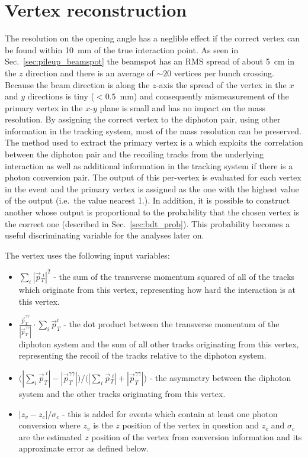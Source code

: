 \section{Vertex reconstruction}
\label{sec:vtx_reco}

The resolution on the opening angle has a neglible effect if the correct vertex can be found within 10~mm of the true interaction point. As seen in Sec.~\ref{sec:pileup_beamspot} the beamspot has an RMS spread of about 5~cm in the $z$ direction and there is an average of $\sim20$ vertices per bunch crossing. Because the beam direction is along the $z$-axis the spread of the vertex in the $x$ and $y$ directions is tiny ($<0.5$~mm) and consequently mismeasurement of the primary vertex in the $x$-$y$ plane is small and has no impact on the mass resolution. By assigning the correct vertex to the diphoton pair, using other information in the tracking system, most of the mass resolution can be preserved. The method used to extract the primary vertex is a \BDT which exploits the correlation between the diphoton pair and the recoiling tracks from the underlying interaction as well as additional information in the tracking system if there is a photon conversion pair. The output of this per-vertex \BDT is evaluated for each vertex in the event and the primary vertex is assigned as the one with the highest value of the \BDT output (i.e.\ the value nearest 1.). In addition, it is possible to construct another \BDT whose output is proportional to the probability that the chosen vertex is the correct one (described in Sec.~\ref{sec:bdt_prob}). This probability becomes a useful discriminating variable for the analyses later on.

The vertex \BDT uses the following input variables:

\begin{itemize}
  \item $\sum\limits_{i} |\vec{p}{}^{\;i}_{T}|^{2}$ - the sum of the transverse momentum squared of all of the tracks which originate from this vertex, representing how hard the interaction is at this vertex.
  \item $\frac{\vec{p}^{\gamma\gamma}_{T}}{|\vec{p}^{\gamma\gamma}_{T}|} \cdot \sum\limits_{i} \vec{p}_{T}^{i}$ - the dot product between the transverse momentum of the diphoton system and the sum of all other tracks originating from this vertex, representing the recoil of the tracks relative to the diphoton system.
  \item $\bigr(|\sum\limits_{i} \vec{p}^{\;i}_{T}| - |\vec{p}^{\gamma\gamma}_{T}|\bigl) / \bigr(|\sum\limits_{i} \vec{p}{}^{\;i}_{T}| + |\vec{p}^{\gamma\gamma}_{T}|\bigl)$ - the asymmetry between the diphoton system and the other tracks originating from this vertex.
  \item $|z_{v}-z_{c}|/\sigma_{c}$ - this is added for events which contain at least one photon conversion where $z_{v}$ is the $z$ position of the vertex in question and $z_{c}$ and $\sigma_{c}$ are the estimated $z$ position of the vertex from conversion information and its approximate error as defined below.
\end{itemize}


